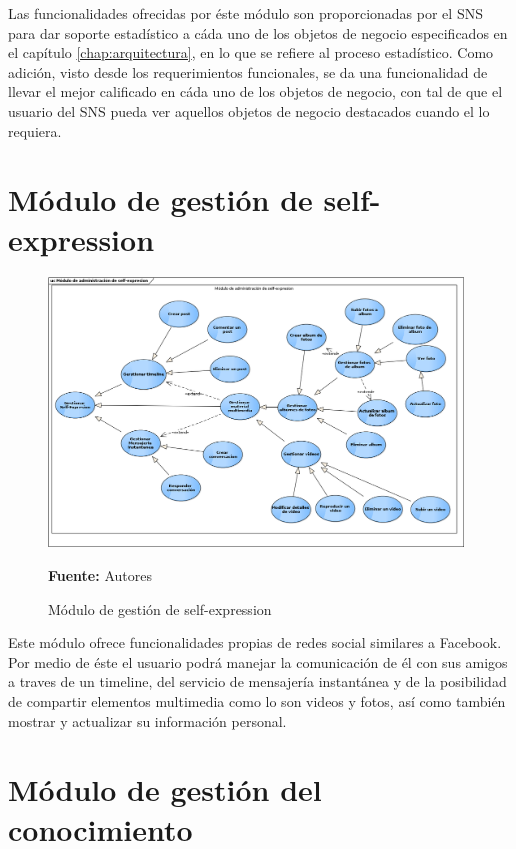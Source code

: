 Las funcionalidades ofrecidas por éste módulo son proporcionadas por el SNS para dar soporte estadístico a cáda uno de los objetos de negocio especificados en el capítulo \ref{chap:arquitectura}, en lo que se refiere al proceso estadístico. Como adición, visto desde los requerimientos funcionales, se da una funcionalidad de llevar el mejor calificado en cáda uno de los objetos de negocio, con tal de que el usuario del SNS pueda ver aquellos objetos de negocio destacados cuando el lo requiera.

\clearpage

\section{Módulo de gestión de self-expression}

\begin{figure}[!htb]
  \begin{center}
    \includegraphics[width=11cm]{./imagenes/casos_uso/gestion_self_sharing.png}
    \caption{Módulo de gestión de self-expression}
    \label{fig:cu_self_shar}
    \textbf{Fuente:} Autores \\
  \end{center}
\end{figure}

Este módulo ofrece funcionalidades propias de redes social similares a Facebook. Por medio de éste el usuario podrá manejar la comunicación de él con sus amigos a traves de un timeline, del servicio de mensajería instantánea y de la posibilidad de compartir elementos multimedia como lo son videos y fotos, así como también mostrar y actualizar su información personal.

\section{Módulo de gestión del conocimiento}

